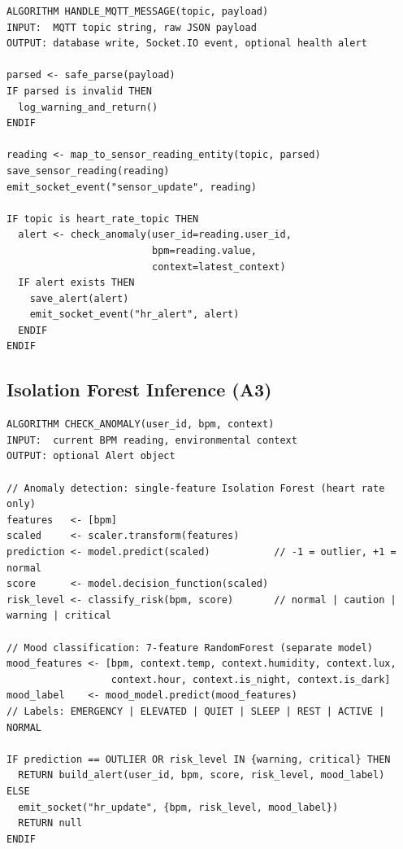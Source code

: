 \begin{lstlisting}[numbers=none,caption={A2: MQTT listener ingestion flow},label={lst:pseudo_mqtt_listener}]
ALGORITHM HANDLE_MQTT_MESSAGE(topic, payload)
INPUT:  MQTT topic string, raw JSON payload
OUTPUT: database write, Socket.IO event, optional health alert

parsed <- safe_parse(payload)
IF parsed is invalid THEN
  log_warning_and_return()
ENDIF

reading <- map_to_sensor_reading_entity(topic, parsed)
save_sensor_reading(reading)
emit_socket_event("sensor_update", reading)

IF topic is heart_rate_topic THEN
  alert <- check_anomaly(user_id=reading.user_id,
                         bpm=reading.value,
                         context=latest_context)
  IF alert exists THEN
    save_alert(alert)
    emit_socket_event("hr_alert", alert)
  ENDIF
ENDIF
\end{lstlisting}

\subsection{Isolation Forest Inference (A3)}

\begin{lstlisting}[numbers=none,caption={A3: Isolation Forest inference},label={lst:pseudo_if_inference}]
ALGORITHM CHECK_ANOMALY(user_id, bpm, context)
INPUT:  current BPM reading, environmental context
OUTPUT: optional Alert object

// Anomaly detection: single-feature Isolation Forest (heart rate only)
features   <- [bpm]
scaled     <- scaler.transform(features)
prediction <- model.predict(scaled)           // -1 = outlier, +1 = normal
score      <- model.decision_function(scaled)
risk_level <- classify_risk(bpm, score)       // normal | caution | warning | critical

// Mood classification: 7-feature RandomForest (separate model)
mood_features <- [bpm, context.temp, context.humidity, context.lux,
                  context.hour, context.is_night, context.is_dark]
mood_label    <- mood_model.predict(mood_features)
// Labels: EMERGENCY | ELEVATED | QUIET | SLEEP | REST | ACTIVE | NORMAL

IF prediction == OUTLIER OR risk_level IN {warning, critical} THEN
  RETURN build_alert(user_id, bpm, score, risk_level, mood_label)
ELSE
  emit_socket("hr_update", {bpm, risk_level, mood_label})
  RETURN null
ENDIF
\end{lstlisting}

